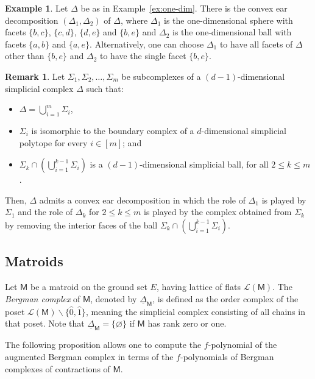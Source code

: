 \documentclass[11pt]{amsart}
\theoremstyle{theorems}
\theoremstyle{definition}
\newtheorem{example}[theorem]{Example}
\newtheorem{remark}[theorem]{Remark}
\newcommand{\M}{{\mathsf{M}}}
\newcommand{\uDelta}{\underline{\Delta}}
\begin{document}
\begin{example} 
Let $\Delta$ be as in Example~\ref{ex:one-dim}. There
is the convex ear decomposition $(\Delta_1, \Delta_2)$ of 
$\Delta$, where $\Delta_1$ is the one-dimensional sphere with 
facets $\{b, c\}$, $\{c, d\}$, $\{d, e\}$ and $\{b, e\}$ and 
$\Delta_2$ is the one-dimensional ball with facets 
$\{a, b\}$ and $\{a, e\}$. Alternatively, one can choose 
$\Delta_1$ to have all facets of $\Delta$ other than 
$\{b, e\}$ and $\Delta_2$ to have the single facet $\{b, e\}$.   
\end{example}

\begin{remark} \label{rem:ced}
Let $\Sigma_1, \Sigma_2,\dots,\Sigma_m$ be subcomplexes of a 
$(d-1)$-dimensional simplicial complex $\Delta$ such that:
%
\begin{itemize}
\item[{\rm (i)}] 
$\Delta = \bigcup_{i=1}^m \Sigma_i$,
    
\item[{\rm (ii)}] 
$\Sigma_i$ is isomorphic to the boundary complex of a 
$d$-dimensional simplicial polytope for every $i \in [m]$; 
and
	
\item[{\rm (iii)}]
$\Sigma_k \cap \left( \bigcup_{i=1}^{k-1} \Sigma_i \right)$ 
is a $(d-1)$-dimensional simplicial ball, for all $2 \le k 
\le m$.
%
\end{itemize}
%
Then, $\Delta$ admits a convex ear decomposition in which 
the role of $\Delta_1$ is played by $\Sigma_1$ and the role 
of $\Delta_k$ for $2 \le k \le m$ is played by the complex 
obtained from $\Sigma_k$ by removing the interior faces of 
the ball $\Sigma_k \cap \left( \bigcup_{i=1}^{k-1} \Sigma_i 
\right)$. 
\end{remark}


\subsection{Matroids}
\label{sec:matroid}

Let $\M$ be a matroid on the ground set $E$, having lattice of 
flats $\mathcal{L}(\M)$. The \emph{Bergman complex} of $\M$, 
denoted by $\uDelta_{\M}$, is defined as the order complex of 
the poset $\mathcal{L}(\M) \smallsetminus 
\{\widehat{0}, \widehat{1}\}$, meaning the simplicial complex 
consisting of all chains in that poset. Note that $\uDelta_{\M} 
= \{\varnothing\}$ if $\M$ has rank zero or one.

The following proposition allows one to compute the $f$-polynomial 
of the augmented Bergman complex in terms of the $f$-polynomials of 
Bergman complexes of contractions of $\M$.
\end{document}
